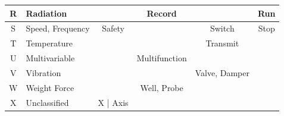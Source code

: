 \documentclass[11pt, openright]{book}
\begin{document}
\begin{table}[ht!]
{\begin{tabular}{|c|l|c|c|c|c|}
            \hline
            R                                             & Radiation                                                  &                                                          & Record                                                              &                                                        & Run                                                      \\
            \hline
            S                                             & Speed, Frequency                                           & Safety                                                   &                                                                     & Switch                                                 & Stop                                                     \\
            \hline
            T                                             & Temperature                                                &                                                          &                                                                     & Transmit                                               &                                                          \\
            \hline
            U                                             & Multivariable                                              &                                                          & Multifunction                                                       &                                                        &                                                          \\
            \hline
            V                                             & Vibration                                                  &                                                          &                                                                     & Valve, Damper                                          &                                                          \\
            \hline
            W                                             & Weight Force                                               &                                                          & Well, Probe                                                         &                                                        &                                                          \\
            \hline
            X                                             & Unclassified                                               & X | Axis                                                 &                                                                     &                                                        &                                                          \\

\end{tabular}}
\end{table}
\end{document}
